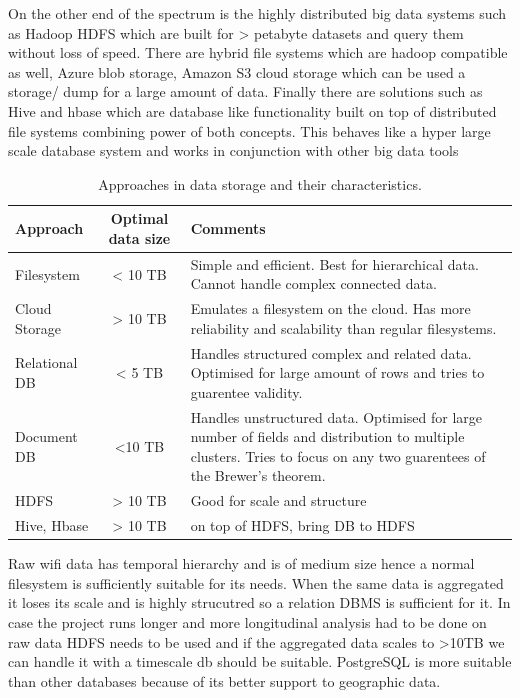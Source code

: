 On the other end of the spectrum is the highly distributed big data systems such as Hadoop HDFS which are built for > petabyte datasets and query them without loss of speed.
There are hybrid file systems which are hadoop compatible as well, Azure blob storage, Amazon S3 cloud storage which can be used a storage/ dump for a large amount of data.
Finally there are solutions such as Hive and hbase which are database like functionality built on top of distributed file systems combining power of both concepts.
This behaves like a hyper large scale database system and works in conjunction with other big data tools


\begin{table}[h]
  \footnotesize
  \begin{center}
    \begin{tabular}{lcp{5cm}}
      \toprule
      Approach & Optimal data size & Comments\\
      \midrule
        Filesystem & \textless{} 10 TB & Simple and efficient. Best for hierarchical data. Cannot handle complex connected data.\\
        Cloud Storage & \textgreater{} 10 TB & Emulates a filesystem on the cloud. Has more reliability and scalability than regular filesystems.\\
        Relational DB & \textless{} 5 TB & Handles structured complex and related data. Optimised for large amount of rows and tries to guarentee validity.\\
        Document DB & \textless 10 TB & Handles unstructured data. Optimised for large number of fields and distribution to multiple clusters. Tries to focus on any two guarentees of the Brewer's theorem.\\
        HDFS & \textgreater{} 10 TB & Good for scale and structure\\
        Hive, Hbase & \textgreater{} 10 TB & on top of HDFS, bring DB to HDFS\\
      \bottomrule
    \end{tabular}
  \end{center}
  \caption{Approaches in data storage and their characteristics.}
  \label{table:toolkit:storage}
\end{table}

Raw wifi data has temporal hierarchy and is of medium size hence a normal filesystem is sufficiently suitable for its needs.
When the same data is aggregated it loses its scale and is highly strucutred so a relation DBMS is sufficient for it.
In case the project runs longer and more longitudinal analysis had to be done on raw data HDFS needs to be used and if the aggregated data scales to >10TB we can handle it with a timescale db should be suitable.
PostgreSQL is more suitable than other databases because of its better support to geographic data.

